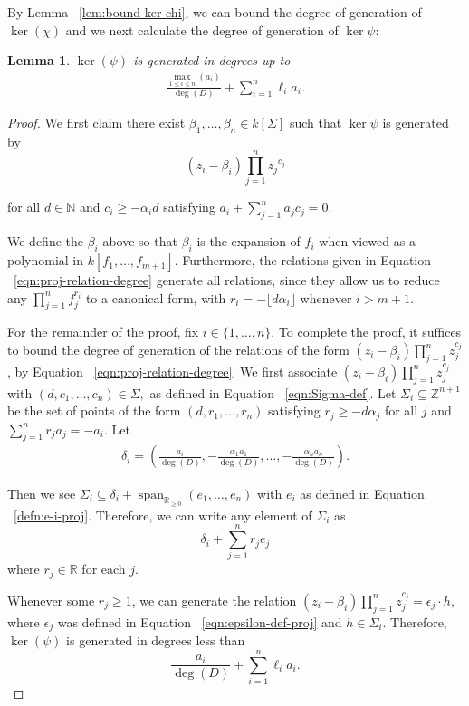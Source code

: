 \documentclass{amsart}
\theoremstyle{plain}
\newtheorem{lem}[thm]{Lemma}
\theoremstyle{definition}
\theoremstyle{remark}
\numberwithin{equation}{section}
\newcommand\br{{\mathbb R}}
\newcommand\bida{a}
\DeclareMathOperator{\newspan}{span}
\begin{document}
By Lemma ~\ref{lem:bound-ker-chi}, we can bound the degree of generation of
$\ker(\chi)$ and we next calculate the degree of generation of $\ker \psi$:

\begin{lem}
\label{lem:proj-relations-psi}
$\ker(\psi)$ is generated in degrees up to
\begin{align}
\label{eqn:proj-relation-degree}
	\frac{\max_{1\le i \le n}(\bida_i)}{\deg(D)} +  \sum_{i=1}^n \ell_i a_i.
\end{align}

\end{lem}

\begin{proof}
We first claim there exist $\beta_1, \ldots, \beta_n \in k[\Sigma]$
such that $\ker \psi$ is generated by
\begin{equation}
\label{eqn:relations-psi-proj}
	(z_i - \beta_i)\prod_{j=1}^n {z_j}^{c_{j}}
\end{equation}

\noindent
for all $d \in \mathbb{N}$ and $c_i \ge -\alpha_i d$ satisfying
$\bida_i + \sum_{j = 1}^n \bida_j c_j = 0$.

We define the $\beta_i$ above so that $\beta_i$ is the expansion of
$f_i$ when viewed as a polynomial in $k[f_1,\ldots, f_{m + 1}]$.
Furthermore, the relations given in Equation
~\eqref{eqn:proj-relation-degree} generate all relations, since they
allow us to reduce any $ \prod_{j = 1}^n f_j^{r_i}$ to a canonical
form, with $r_i = -\lfloor  d \alpha_i\rfloor$ whenever $i  > m + 1$.

For the remainder of the proof, fix $i \in \{1,\ldots, n\}$. To
complete the proof, it suffices to bound the degree of generation
of the relations of the form $(z_i - \beta_i) \prod_{j = 1}^n
z_j^{c_j}$, by Equation ~\eqref{eqn:proj-relation-degree}. We first
associate $(z_i - \beta_i)\prod_{j=1}^n z_j^{c_j}$ with $(d, c_1,
\ldots, c_n) \in \Sigma,$ as defined in Equation
~\eqref{eqn:Sigma-def}. Let $\Sigma_i \subseteq \mathbb{Z}^{n + 1}$
be the set of points of the form $(d, r_1, \ldots, r_n)$ satisfying
$r_j \ge -d \alpha_j$ for all $j$ and $\sum_{j=1}^n r_j a_j = -a_i$.
Let
\begin{align*}
	\delta_i = \left(\frac{a_i}{\deg(D)}, -\frac{\alpha_1 a_1}{\deg(D)},
	\ldots, - \frac{\alpha_n a_n}{\deg(D)} \right).
\end{align*}

\noindent
Then we see $\Sigma_i \subseteq \delta_i + \newspan_{\br_{\geq 0}}
(e_1, \ldots, e_n)$ with $e_i$ as defined in Equation
~\ref{defn:e-i-proj}. Therefore, we can write any element of
$\Sigma_i$ as
\[
	\delta_i + \sum_{j=1}^n r_j e_j
\]
where $r_j \in \mathbb{R}$ for each $j$.

Whenever some $r_j \ge 1$, we can generate the relation $(z_i -
\beta_i)\prod_{j=1}^n z_j^{c_j} = \epsilon_j \cdot h,$ where
$\epsilon_j$ was defined in Equation ~\ref{eqn:epsilon-def-proj} and
$h \in \Sigma_i$. Therefore, $\ker(\psi)$ is generated in degrees
less than
\[
	\frac{\bida_i}{\deg(D)} + \sum_{i=1}^n \ell_i a_i.
\]
\end{proof}
\end{document}
